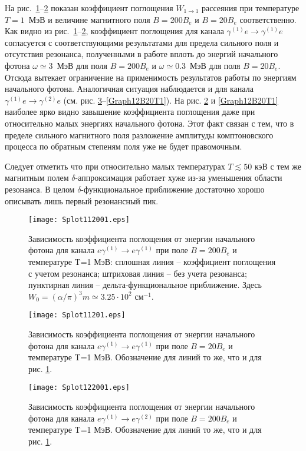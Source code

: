 На рис.~\ref{Graph11B200T1}--\ref{Graph11B20T1} показан  коэффициент поглощения $W_{1\to1}$ рассеяния при температуре $T=1 $~МэВ и величине магнитного поля $B=200B_e$ и $B=20B_e$ соответственно. Как видно из рис.~\ref{Graph11B200T1}--\ref{Graph11B20T1}, коэффициент поглощения для канала $\gamma^{(1)}e\to\gamma^{(1)}e$ согласуется с соответствующими результатами для предела сильного поля и отсутствия резонанса, полученными в работе \cite{Chistyakov:2009} вплоть до энергий начального фотона  $\omega\simeq3$~МэВ для поля $B=200B_e$ и  $\omega\simeq0.3$~МэВ для поля $B=20B_e$. Отсюда вытекает ограничение на применимость результатов работы \cite{Chistyakov:2009} по энергиям начального фотона. Аналогичная ситуация наблюдается и для канала $\gamma^{(1)}e\to\gamma^{(2)}e$ (см. рис. \ref{Graph12B200T1}--\ref{Graph12B20T1}).  На рис. \ref{Graph11B20T1} и \ref{Graph12B20T1} наиболее ярко видно завышение коэффициента поглощения даже при относительно малых энергиях начального фотона. Этот факт связан с тем, что в пределе сильного магнитного поля разложение амплитуды комптоновского процесса по обратным степеням поля уже не будет правомочным.  

Следует отметить   что при относительно малых температурах $T\lesssim50$ кэВ с тем же магнитным полем $\delta$-аппроксимация работает хуже из-за уменьшения области резонанса. В целом $\delta$-функциональное приближение достаточно хорошо описывать лишь первый резонансный пик.

\begin{figure}[t!]\centering
	\texttt{[image: Splot112001.eps]}
	\caption{Зависимость коэффициента поглощения от энергии начального фотона для канала $e\gamma^{(1)}\to e\gamma^{(1)}$ при поле $B=200 B_e$ и температуре T=1 МэВ: сплошная линия -- коэффициент поглощения с учетом резонанса; штриховая линия -- без учета резонанса; пунктирная линия -- дельта-функциональное приближение. Здесь $W_0=(\alpha/\pi)^3m\simeq 3.25\cdot10^2$ см$^{-1}$.}
	\label{Graph11B200T1}
\end{figure}

\begin{figure}[t!]\centering
	\texttt{[image: Splot11201.eps]}
	\caption{Зависимость коэффициента поглощения от энергии начального фотона для канала $e\gamma^{(1)}\to e\gamma^{(1)}$ при поле $B=20 B_e$ и температуре T=1 МэВ. Обозначение для линий то же, что и для рис. \ref{Graph11B200T1}.}
	\label{Graph11B20T1}
\end{figure}

\begin{figure}[t!]\centering
	\texttt{[image: Splot122001.eps]}
	\caption{Зависимость коэффициента поглощения от энергии начального фотона для канала $e\gamma^{(1)}\to e\gamma^{(2)}$ при поле $B=200 B_e$ и температуре T=1 МэВ. Обозначение для линий то же, что и для рис. \ref{Graph11B200T1}.}
	\label{Graph12B200T1}
\end{figure}

